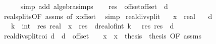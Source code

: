 \begin{isabellebody}
\ \ \ \ \isamarkupfalse%
\ {\isacharparenleft}{\kern0pt}simp\ add{\isacharcolon}{\kern0pt}\ algebra{\isacharunderscore}{\kern0pt}simps{\isacharparenright}{\kern0pt}\isanewline
\ \ \isamarkupfalse%
\ {\isachardoublequoteopen}{\isacharquery}{\kern0pt}res\ {\isasymin}\ {\isacharbraceleft}{\kern0pt}offset{\isacharless}{\kern0pt}{\isachardot}{\kern0pt}{\isachardot}{\kern0pt}offset\ {\isacharplus}{\kern0pt}\ d{\isacharbraceright}{\kern0pt}{\isachardoublequoteclose}\isanewline
\ \ \ \ \isamarkupfalse%
\ real{\isacharunderscore}{\kern0pt}splits{\isacharbrackleft}{\kern0pt}OF\ assms{\isacharcomma}{\kern0pt}\ of\ {\isachardoublequoteopen}x{\isacharminus}{\kern0pt}offset{\isachardoublequoteclose}{\isacharbrackright}{\kern0pt}\ \isamarkupfalse%
\ simp\isanewline
{}\isamarkupfalse%
%
\endisatagproof
{\isafoldproof}%
%
\isadelimproof
\isanewline
%
\endisadelimproof
\isanewline
{}\isamarkupfalse%
\ real{\isacharunderscore}{\kern0pt}div{\isacharunderscore}{\kern0pt}split{}{\isacharcolon}{\kern0pt}\isanewline
\ \ \ x\ {\isacharcolon}{\kern0pt}{\isacharcolon}{\kern0pt}\ real\isanewline
\ \ \ {\isachardoublequoteopen}d\ {\isachargreater}{\kern0pt}\ {}{\isachardoublequoteclose}\isanewline
\ \ \ k\ {\isacharcolon}{\kern0pt}{\isacharcolon}{\kern0pt}\ int\ \ res\ {\isacharcolon}{\kern0pt}{\isacharcolon}{\kern0pt}real\ \ {\isachardoublequoteopen}x\ {\isacharequal}{\kern0pt}\ res\ {\isacharplus}{\kern0pt}\ d{\isacharasterisk}{\kern0pt}real{\isacharunderscore}{\kern0pt}of{\isacharunderscore}{\kern0pt}int\ k{\isachardoublequoteclose}\ {\isachardoublequoteopen}{}\ {\isasymle}\ res{\isachardoublequoteclose}\ {\isachardoublequoteopen}res\ {\isacharless}{\kern0pt}\ d{\isachardoublequoteclose}\isanewline
%
\isadelimproof
\ \ %
\endisadelimproof
%
\isatagproof
{}\isamarkupfalse%
\ real{\isacharunderscore}{\kern0pt}div{\isacharunderscore}{\kern0pt}split{\isacharunderscore}{\kern0pt}coi{\isacharbrackleft}{\kern0pt}\ {\isacharquery}{\kern0pt}d\ {\isacharequal}{\kern0pt}\ d\ \ {\isacharquery}{\kern0pt}offset\ {\isacharequal}{\kern0pt}\ {}\ \ {\isacharquery}{\kern0pt}x\ {\isacharequal}{\kern0pt}\ x\ \ {\isacharquery}{\kern0pt}thesis\ {\isacharequal}{\kern0pt}\ thesis{\isacharcomma}{\kern0pt}\ OF\ assms{\isacharbrackright}{\kern0pt}\isanewline

\end{isabellebody}
